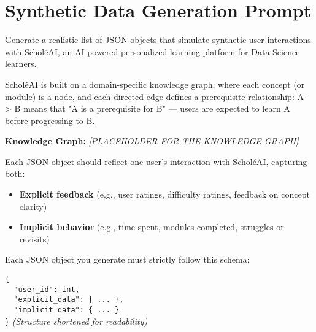 \section{Synthetic Data Generation Prompt}
\label{appendix:prompt1}

\begin{tcolorbox}[colback=gray!5!white, colframe=black!60!black, title=Prompt: Synthetic Data Generation]
{\footnotesize
Generate a realistic list of JSON objects that simulate synthetic user interactions with Schol\'eAI, an AI-powered personalized learning platform for Data Science learners.

ScholéAI is built on a domain-specific knowledge graph, where each concept (or module) is a node, and each directed edge defines a prerequisite relationship: {A -> B} means that "A is a prerequisite for B" — users are expected to learn A before progressing to B.

\vspace{0.3cm}

\textbf{Knowledge Graph:}
\textit{[PLACEHOLDER FOR THE KNOWLEDGE GRAPH]}

\vspace{0.3cm}

Each JSON object should reflect one user’s interaction with Schol\'eAI, capturing both:
\begin{itemize}
  \item \textbf{Explicit feedback} (e.g., user ratings, difficulty ratings, feedback on concept clarity)
  \item \textbf{Implicit behavior} (e.g., time spent, modules completed, struggles or revisits)
\end{itemize}

\vspace{0.3cm}

Each JSON object you generate must strictly follow this schema:

\texttt{\{\\
\ \ "user\_id": int,\\
\ \ "explicit\_data": \{ ... \},\\
\ \ "implicit\_data": \{ ... \}\\
\}} \hfill \textit{(Structure shortened for readability)}

\vspace{0.3cm}

}
\end{tcolorbox}

